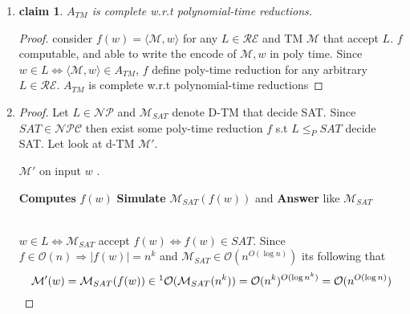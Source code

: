 \documentclass[12pt]{article}
\newtheorem*{claim*}{claim}
\begin{document}
\begin{enumerate}[label=(\alph*)]
\item {}
\begin{claim*} $A_{TM}$ is complete w.r.t polynomial-time reductions.
\end{claim*}
\begin{proof} consider $f(w)=\langle \mathcal{M} ,w \rangle$ for any
 $L\in \mathcal{RE}$ and TM $\mathcal{M}$ that accept $L$. $f$ computable, and able to write the encode of $\mathcal{M} ,w $  in poly time.  Since $w\in L \Leftrightarrow 
\langle \mathcal{M} ,w \rangle \in A_{TM} $,  $f$ define poly-time reduction for any arbitrary $L \in \mathcal{RE}$. $A_{TM}$ is complete w.r.t polynomial-time reductions\end{proof}
\item {}
\begin{proof}
Let $L\in \mathcal{NP}$ and $\mathcal{M}_{SAT}$ denote D-TM  that decide SAT. Since $SAT\in\mathcal{NPC}$ then exist some poly-time reduction $f$ s.t  $L\le_PSAT$ decide SAT. Let look at d-TM $\mathcal{M}'$.
\begin{algorithm}
\caption{ $\mathcal{M}'$ on input $w$ .}\label{alg:cap}
\begin{algorithmic} 
\State  \textbf{Computes}  $f(w)$
\State \textbf{Simulate} $\mathcal{M}_{SAT}(f(w))$
and \textbf{Answer} like $\mathcal{M}_{SAT}$
\end{algorithmic}
\end{algorithm}\\
$w\in L \Leftrightarrow \mathcal{M}_{SAT}$ accept $f(w) \Leftrightarrow f(w) \in SAT$. Since $f\in \mathcal{O}(n)\Rightarrow |f(w)|=n^k$ and $\mathcal{M}_{SAT}\in \mathcal{O}{(n^{O(\log n)})}$ its following that
\[ \mathcal{M}'(w)=\mathcal{M}_{SAT}(f(w))\in\footnote{Not realy sure if its the proper way to write it.}\mathcal{O}(\mathcal{M}_{SAT}(n^k))= \mathcal{O}(n^k)^{O(\log n^k)}=\mathcal{O}(n^{O(\log n)})
\]
\end{proof}
\end{enumerate}
\end{document}
